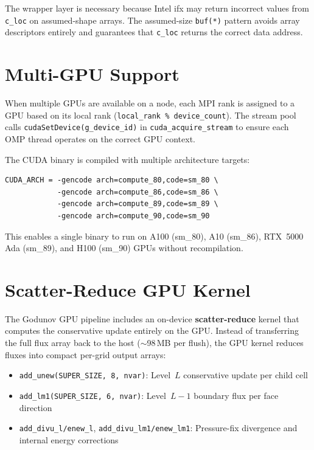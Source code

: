 \documentclass[11pt,fleqn]{book}
\begin{document}
The wrapper layer is necessary because Intel ifx may return incorrect values from \texttt{c\_loc} on assumed-shape arrays.  The assumed-size \texttt{buf(*)} pattern avoids array descriptors entirely and guarantees that \texttt{c\_loc} returns the correct data address.

\section{Multi-GPU Support}

When multiple GPUs are available on a node, each MPI rank is assigned to a GPU based on its local rank (\texttt{local\_rank \% device\_count}).  The stream pool calls \texttt{cudaSetDevice(g\_device\_id)} in \texttt{cuda\_acquire\_stream} to ensure each OMP thread operates on the correct GPU context.

The CUDA binary is compiled with multiple architecture targets:
\begin{lstlisting}[basicstyle=\small\ttfamily,frame=single]
CUDA_ARCH = -gencode arch=compute_80,code=sm_80 \
            -gencode arch=compute_86,code=sm_86 \
            -gencode arch=compute_89,code=sm_89 \
            -gencode arch=compute_90,code=sm_90
\end{lstlisting}
This enables a single binary to run on A100 (sm\_80), A10 (sm\_86), RTX~5000 Ada (sm\_89), and H100 (sm\_90) GPUs without recompilation.

\section{Scatter-Reduce GPU Kernel}

The Godunov GPU pipeline includes an on-device \textbf{scatter-reduce} kernel that computes the conservative update entirely on the GPU.  Instead of transferring the full flux array back to the host ($\sim$98\,MB per flush), the GPU kernel reduces fluxes into compact per-grid output arrays:

\begin{itemize}[nosep]
\item \texttt{add\_unew(SUPER\_SIZE, 8, nvar)}: Level~$L$ conservative update per child cell
\item \texttt{add\_lm1(SUPER\_SIZE, 6, nvar)}: Level~$L{-}1$ boundary flux per face direction
\item \texttt{add\_divu\_l/enew\_l}, \texttt{add\_divu\_lm1/enew\_lm1}: Pressure-fix divergence and internal energy corrections
\end{itemize}
\end{document}
